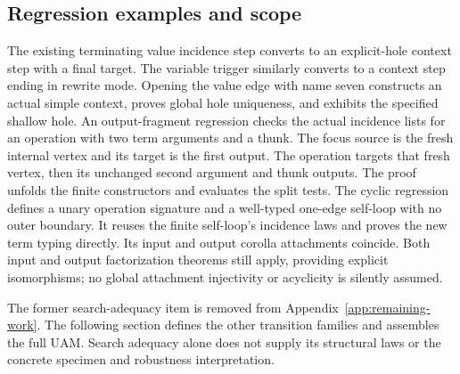\subsection{Regression examples and scope}
The existing terminating value incidence step converts to an explicit-hole
context step with a final target. The variable trigger similarly converts to
a context step ending in rewrite mode. Opening the value edge with name seven
constructs an actual simple context, proves global hole uniqueness, and
exhibits the specified shallow hole.
An output-fragment regression checks the actual incidence lists for an
operation with two term arguments and a thunk. The focus source is the fresh
internal vertex and its target is the first output. The operation targets
that fresh vertex, then its unchanged second argument and thunk outputs.
The proof unfolds the finite constructors and evaluates the split tests.
The cyclic regression defines a unary operation signature and a well-typed
one-edge self-loop with no outer boundary. It reuses the finite self-loop's
incidence laws and proves the new term typing directly. Its input and output
corolla attachments coincide. Both input and output factorization theorems
still apply, providing explicit isomorphisms; no global attachment injectivity
or acyclicity is silently assumed.

The former search-adequacy item is removed from Appendix~\ref{app:remaining-work}.
The following section defines the other transition families and assembles the
full UAM. Search adequacy alone does not supply its structural laws or the
concrete specimen and robustness interpretation.

